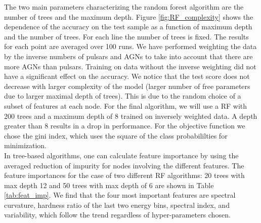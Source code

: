 The two main parameters characterizing the random forest algorithm are the number of trees and the maximum depth. 
Figure \ref{fig:RF_complexity} shows the dependence of the accuracy on the test sample as a function of maximum depth and the number of trees. For each line the number of trees is fixed.
The results for each point are averaged over 100 runs.
We have performed weighting the data by the inverse numbers of pulsars and AGNs to take into account that there are more AGNs than pulsars. Training on data without the inverse weighting did not have a significant effect on the accuracy.
We notice that the test score does not decrease with larger complexity of the model 
(larger number of free parameters due to larger maximal depth of trees).
This is due to the random choice of a subset of features at each node.
For the final algorithm, we will use a RF with 200 trees and a maximum depth of 8 trained on inversely weighted data. A depth greater than 8 results in a drop in performance. For the objective function we chose the gini index, which uses the square of the class probabililties for minimization.\\

In tree-based algorithms, one can calculate feature importance by using the averaged reduction of impurity for nodes involving the different features. The feature importances for the case of two different RF algorithms: 20 trees with max depth 12 and 50 trees with max depth of 6 are shown in Table \ref{tab:feat_imp}.
We find that the four most important features are spectral curvature, hardness ratio of the last two energy bins, spectral index, and variability, which follow the trend regardless of hyper-parameters chosen.


